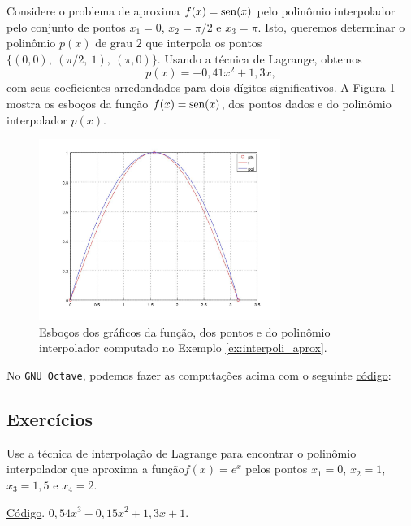\begin{ex}\label{ex:interpoli_aprox}
  Considere o problema de aproxima $f(x) = \operatorname{sen}(x)$ pelo polinômio interpolador pelo conjunto de pontos $x_1=0$, $x_2=\pi/2$ e $x_3=\pi$. Isto, queremos determinar o polinômio $p(x)$ de grau $2$ que interpola os pontos $\{(0,0),~(\pi/2,~1),~(\pi,0)\}$. Usando a técnica de Lagrange, obtemos
  \begin{equation}
    p(x) = -0,41x^2 + 1,3x,
  \end{equation}
com seus coeficientes arredondados para dois dígitos significativos. A Figura \ref{fig:interpoli_aprox} mostra os esboços da função $f(x)=\operatorname{sen}(x)$, dos pontos dados e do polinômio interpolador $p(x)$.

\begin{figure}[h!]
  \centering
  \includegraphics[width=0.7\textwidth]{./cap_interp/dados/ex_interpoli_aprox/fig_interpoli_aprox}
  \caption{Esboços dos gráficos da função, dos pontos e do polinômio interpolador computado no Exemplo \ref{ex:interpoli_aprox}.}
  \label{fig:interpoli_aprox}
\end{figure}

\ifisoctave
No \verb+GNU Octave+, podemos fazer as computações acima com o seguinte \href{https://github.com/phkonzen/notas/blob/master/src/MatematicaNumerica/cap_interp/dados/ex_interpoli_aprox/ex_interpoli_aprox.m}{código}:

\fi
\end{ex}

\subsection*{Exercícios}

\begin{exer}
  Use a técnica de interpolação de Lagrange para encontrar o polinômio interpolador que aproxima a função$f(x)=e^{x}$ pelos pontos $x_1=0$, $x_2=1$, $x_3=1,5$ e $x_4=2$.
\end{exer}
\begin{resp}
\ifisoctave
\href{https://github.com/phkonzen/notas/blob/master/src/MatematicaNumerica/cap_interp/dados/exer_interpoli_aprox1/exer_interpoli_aprox1.m}{Código}.
\fi
$0,54x^3 - 0,15x^2 + 1,3x + 1$.
\end{resp}

\emconstrucao
